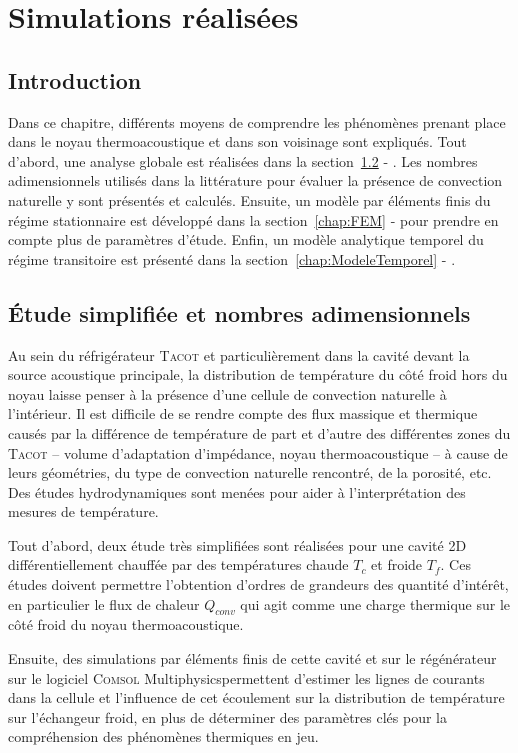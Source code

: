\chapter{Simulations réalisées}\label{chap:SimusRealisees}
\mylocaltoc

\section{Introduction}
Dans ce chapitre, différents moyens de comprendre les phénomènes prenant place dans le noyau thermoacoustique et dans son voisinage sont expliqués. Tout d'abord, une analyse globale est réalisées dans la section~\ref{chap:NbrAdim} - . Les nombres adimensionnels utilisés dans la littérature pour évaluer la présence de convection naturelle y sont présentés et calculés. Ensuite, un modèle par éléments finis du régime stationnaire est développé dans la section~\ref{chap:FEM} -  pour prendre en compte plus de paramètres d'étude. Enfin, un modèle analytique temporel du régime transitoire est présenté dans la section~\ref{chap:ModeleTemporel} - .

\section{\'Etude simplifiée et nombres adimensionnels}\label{chap:NbrAdim}
Au sein du réfrigérateur \textsc{Tacot} et particulièrement dans la cavité devant la source acoustique principale, la distribution de température du côté froid hors du noyau laisse penser à la présence d'une cellule de convection naturelle à l'intérieur. Il est difficile de se rendre compte des flux massique et thermique causés par la différence de température de part et d'autre des différentes zones du \textsc{Tacot} -- volume d'adaptation d'impédance, noyau thermoacoustique -- à cause de leurs géométries, du type de convection naturelle rencontré, de la porosité, etc. Des études hydrodynamiques sont menées pour aider à l'interprétation des mesures de température. \medskip

Tout d'abord, deux étude très simplifiées sont réalisées pour une cavité 2D différentiellement chauffée par des températures chaude $T_c$ et froide $T_f$. Ces études doivent permettre l'obtention d'ordres de grandeurs des quantité d'intérêt, en particulier le flux de chaleur $Q_{conv}$ qui agit comme une charge thermique sur le côté froid du noyau thermoacoustique. \smallskip

Ensuite, des simulations par éléments finis de cette cavité et sur le régénérateur sur le logiciel \textsc{Comsol} Multiphysics\textss\textregistered permettent d'estimer les lignes de courants dans la cellule et l'influence de cet écoulement sur la distribution de température sur l'échangeur froid, en plus de déterminer des paramètres clés pour la compréhension des phénomènes thermiques en jeu.

